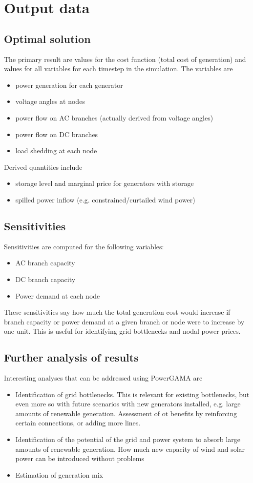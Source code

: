 \documentclass{article}
\begin{document}
\section{Output data}


\subsection{Optimal solution}
The primary result are values for the cost function (total cost of generation) and values for all variables for each timestep in the simulation. The variables are
\begin{itemize}
\item power generation for each generator
\item voltage angles at nodes
\item power flow on AC branches (actually derived from voltage angles)
\item power flow on DC branches 
\item load shedding at each node
\end{itemize}
Derived quantities include
\begin{itemize}
\item storage level and marginal price for generators with storage
\item spilled power inflow (e.g. constrained/curtailed wind power)
\end{itemize}


\subsection{Sensitivities}
Sensitivities are computed for the following variables:
\begin{itemize}
\item AC branch capacity
\item DC branch capacity
\item Power demand at each node
\end{itemize}
These sensitivities say how much the total generation cost would increase if branch capacity or power demand at a given branch or node were to increase by one unit. 
This is useful for identifying grid bottlenecks and nodal power prices.


\subsection{Further analysis of results}
Interesting analyses that can be addressed using PowerGAMA are
\begin{itemize}
\item Identification of grid bottlenecks. This is relevant for existing bottlenecks, but even more so with future scenarios with new generators installed, e.g. large amounts of renewable generation. Assessment of ot benefits by reinforcing certain connections, or adding more lines.
\item Identification of the potential of the grid and power system to absorb large amounts of renewable generation. How much new capacity of wind and solar power can be introduced without problems
\item Estimation of generation mix 
\end{itemize}
\end{document}
